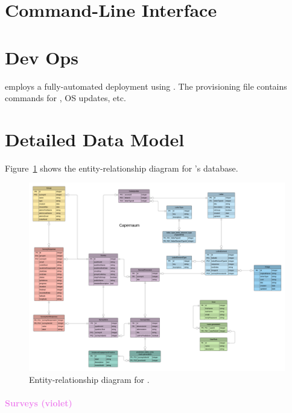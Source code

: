 \documentclass{article}
\begin{document}
\section{Command-Line Interface}
\label{sec:cli}

\section{Dev Ops}
\label{sec:deployment}

\caper{} employs a fully-automated deployment
using \ansible.
The provisioning file contains commands for \gh{}, OS updates, etc.

\appendix

\section{Detailed Data Model}
\label{sec:detailed-data-model}

Figure~\ref{fig:erd} shows the entity-relationship diagram for \caper's \pg{} database.
\begin{figure}
  \centering
  \includegraphics[width=\textwidth]{data-model}
  \caption{Entity-relationship diagram for \caper.}
  \label{fig:erd}
\end{figure}

\paragraph{\textcolor{Violet}{Surveys (violet)}}
\end{document}
